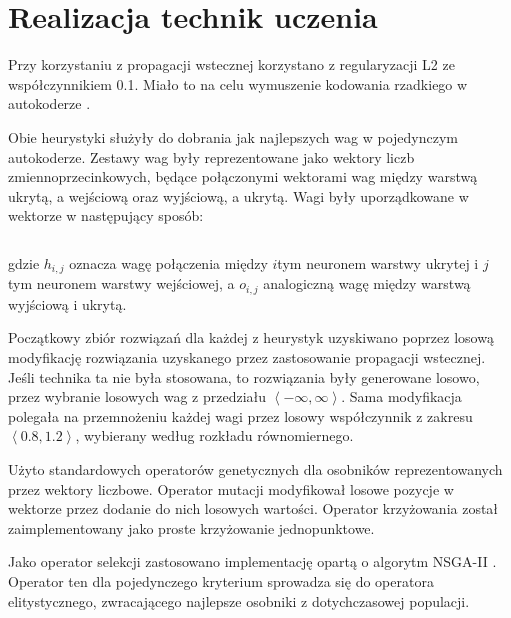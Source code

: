 \documentclass[11pt,a4paper,oneside]{report}
\begin{document}

\section{Realizacja technik uczenia}

Przy korzystaniu z propagacji wstecznej korzystano z regularyzacji L2 \cite{girosi1995regularization} ze współczynnikiem 0.1. Miało to na celu wymuszenie kodowania rzadkiego w autokoderze \cite{ngiam2011optimization}.

Obie heurystyki służyły do dobrania jak najlepszych wag w pojedynczym autokoderze. Zestawy wag były reprezentowane jako wektory liczb zmiennoprzecinkowych, będące połączonymi wektorami wag między warstwą ukrytą, a wejściową oraz wyjściową, a ukrytą. Wagi były uporządkowane w wektorze w następujący sposób:

\begin{displaymath}
	[ h_{0, 0}, h_{0, 1}, \ldots, h_{1, 0}, h_{1, 1}, \ldots, o_{0, 0}, o_{0, 1}, \ldots, o_{1, 0}, o_{1, 1}, \ldots ]
\end{displaymath}

gdzie $h_{i, j}$ oznacza wagę połączenia między $i$tym neuronem warstwy ukrytej i $j$tym neuronem warstwy wejściowej, a $o_{i, j}$ analogiczną wagę między warstwą wyjściową i ukrytą.

Początkowy zbiór rozwiązań dla każdej z heurystyk uzyskiwano poprzez losową modyfikację rozwiązania uzyskanego przez zastosowanie propagacji wstecznej. Jeśli technika ta nie była stosowana, to rozwiązania były generowane losowo, przez wybranie losowych wag z przedziału $\left\langle -\infty, \infty \right\rangle $. Sama modyfikacja polegała na przemnożeniu każdej wagi przez losowy współczynnik z zakresu $\left\langle 0.8, 1.2 \right\rangle $, wybierany według rozkładu równomiernego.

Użyto standardowych operatorów genetycznych dla osobników reprezentowanych przez wektory liczbowe. Operator mutacji modyfikował losowe pozycje w wektorze przez dodanie do nich losowych wartości. Operator krzyżowania został zaimplementowany jako proste krzyżowanie jednopunktowe.

Jako operator selekcji zastosowano implementację opartą o algorytm NSGA-II \cite{deb2002fast}. Operator ten dla pojedynczego kryterium sprowadza się do operatora elitystycznego, zwracającego najlepsze osobniki z dotychczasowej populacji.
\end{document}
